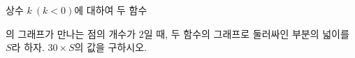 상수 $k\ (k<0)$에 대하여 두 함수 \par\smallskip{}\par\smallskip\noindent 의 그래프가 만나는 점의 개수가 $2$일 때, 두 함수의 그래프로 둘러싸인 부분의 넓이를 $S$라 하자. $30\times S$의 값을 구하시오.
